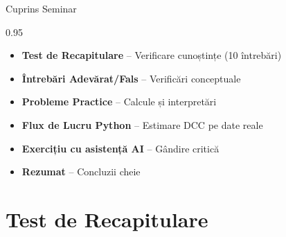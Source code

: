 \documentclass[9pt, aspectratio=169, t]{beamer}
\subtitle{Seminar 5b: Modele GARCH Multivariate}
\begin{document}
{
\begin{frame}
    \titlepage
\end{frame}
}

\begin{frame}{Cuprins Seminar}
    \begin{cminipage}{0.95\textwidth}
    \begin{itemize}\setlength{\itemsep}{0pt}
        \item \textbf{Test de Recapitulare} -- Verificare cunoștințe (10 întrebări)
        \vspace{0.15cm}
        \item \textbf{Întrebări Adevărat/Fals} -- Verificări conceptuale
        \vspace{0.15cm}
        \item \textbf{Probleme Practice} -- Calcule și interpretări
        \vspace{0.15cm}
        \item \textbf{Flux de Lucru Python} -- Estimare DCC pe date reale
        \vspace{0.15cm}
        \item \textbf{Exercițiu cu asistență AI} -- Gândire critică
        \vspace{0.15cm}
        \item \textbf{Rezumat} -- Concluzii cheie
    \end{itemize}
    \end{cminipage}
\end{frame}

\section{Test de Recapitulare}
\end{document}
